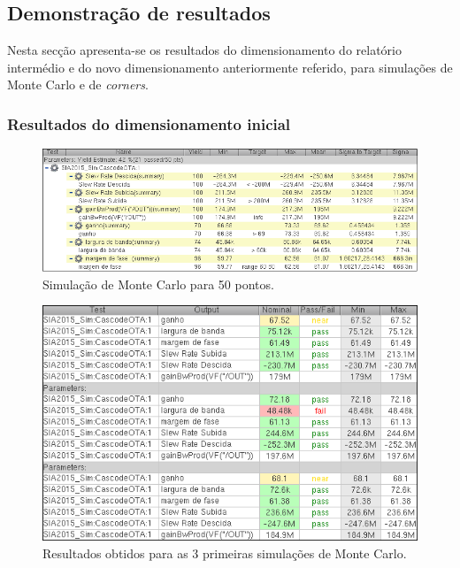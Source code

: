 \documentclass[11pt]{article}
\numberwithin{equation}{section}
\begin{document}
\subsection{Demonstração de resultados} 

Nesta secção apresenta-se os resultados do dimensionamento do relatório intermédio e do novo dimensionamento anteriormente referido, para simulações de Monte Carlo e de \textit{corners}.

\subsubsection{Resultados do dimensionamento inicial} 

\begin{figure}[H]
	\centering
	\includegraphics[keepaspectratio=true, scale=0.65]{exps/MonteCarlo_50pt_Antigo}
	\vspace{-0.5em}
	\caption{Simulação de Monte Carlo para 50 pontos.}
	\vspace{-0.8em}
\end{figure} 

\begin{figure}[H]
	\centering
	\includegraphics[keepaspectratio=true, scale=0.65]{exps/MonteCarlo_3pt_Antigo}
	\vspace{-0.5em}
	\caption{Resultados obtidos para as 3 primeiras simulações de Monte Carlo.}
	\vspace{-0.8em}
\end{figure} 
\end{document}
